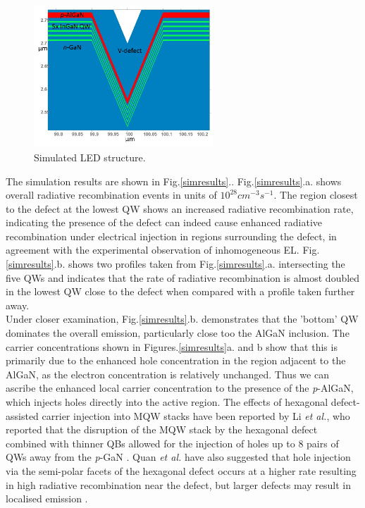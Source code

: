 \begin{figure}[h]
	\centering
	\includegraphics[width=0.6\textwidth]{Figs/Ch3/Sim}
	\caption[h] {Simulated LED structure.}
	\label{simsetup}
\end{figure}
\FloatBarrier 

The simulation results are shown in Fig.\ref{simresults}.. Fig.\ref{simresults}.a. shows overall radiative recombination events in units of $10^{28} cm^{-3}s^{-1}$. The region closest to the defect at the lowest QW shows an increased radiative recombination rate, indicating the presence of the defect can indeed cause enhanced radiative recombination under electrical injection in regions surrounding the defect, in agreement with the experimental observation of inhomogeneous EL. Fig.\ref{simresults}.b. shows two profiles taken from Fig.\ref{simresults}.a. intersecting the five QWs and indicates that the rate of radiative recombination is almost doubled in the lowest QW close to the defect when compared with a profile taken further away.\\
Under closer examination, Fig.\ref{simresults}.b. demonstrates that the 'bottom' QW dominates the overall emission, particularly close too the AlGaN inclusion. The carrier concentrations shown in Figures.\ref{simresults}a. and b show that this is primarily due to the enhanced hole concentration in the region adjacent to the AlGaN, as the electron concentration is relatively unchanged. Thus we can ascribe the enhanced local carrier concentration to the presence of the \textit{p}-AlGaN, which injects holes directly into the active region. The effects of hexagonal defect-assisted carrier injection into MQW stacks have been reported by Li \textit{et al.}, who reported that the disruption of the MQW stack by the hexagonal defect combined with thinner QBs allowed for the injection of holes up to 8 pairs of QWs away from the \textit{p}-GaN \cite{Li2014}. Quan \textit{et al.} have also suggested that hole injection via the semi-polar facets of the hexagonal defect occurs at a higher rate resulting in high radiative recombination near the defect, but larger defects may result in localised emission \cite{Quan2014}.

